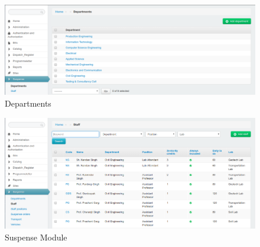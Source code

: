 \begin{figure}[h!]
\centering \includegraphics[scale=0.4]{input/images/suspense_dept.png}
\caption{ Departments}
\label{fig:UI1}
\end{figure}

\begin{figure}[h!]
\centering \includegraphics[scale=0.4]{input/images/suspense_staff.png}
\caption{ Suspense Module}
\label{fig:UI1}
\end{figure}

